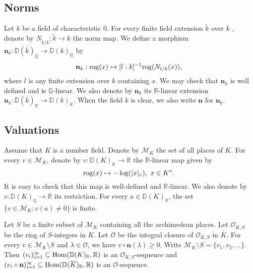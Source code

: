 \documentclass[12pt]{amsart}
\theoremstyle{plain}
\theoremstyle{remark}
\theoremstyle{definition}
\def\Q{\mathbb Q}
\def\R{\mathbb R}
\def\D{\mathbb D}
\def\rog{{\rm rog}}
\begin{document}
\subsection{Norms}Let $k$ be a field of characteristic $0$. For every finite field extension $\widetilde{k}$ over $k$ , denote by $N_{\widetilde{k} / k}: \widetilde{k} \to k$ the norm map. We define a morphism $\mathbf{n}_k: \D(\overline{k}) _{\Q}\to \D(k)_{\Q}$ by\begin{equation*}
	\mathbf{n}_k: \rog (x) \mapsto[l:k]^{-1} \rog (N_{l / k}(x)),
\end{equation*}
where $l$ is any finite extension over $k$ containing $x$. We may check that $\mathbf{n}_k$ is well defined and is $\Q$-linear. 
We also denote by $\mathbf{n}_k$ its $\R$-linear extension $\mathbf{n}_k: \D(\overline{k})_{\R} \to \D(k)_{\R}$. When the field $k$ is clear, we also write $\mathbf{n}$ for $\mathbf{n}_k$. 
\subsection{Valuations}
Assume that $K$ is a number field. Denote by $\mathcal{M}_K$ the set of all places of $K$. For every $v \in \mathcal{M}_K$, denote by $v: \D(K)_{\R} \to\R$ the $\R$-linear map given by$$\rog(x)\mapsto-\log(\lvert x\rvert_{v}),\ x\in K^*.$$It is easy to check that this map is well-defined and $\R$-linear. We also denote by $v: \D(K)_{\Q} \to \R$ its restriction. For every $a \in \D(K)_{\R}$, the set $\{v \in \mathcal{M}_K:v(a) \neq 0\}$ is finite.\par 
Let $S$ be a finite subset of $\mathcal{M}_K$ containing all the archimedean places. Let $\mathcal{O}_{K, S}$ be the ring of $S$-integers in $K$. Let $\mathcal{O}$ be the integral closure of $\mathcal{O}_{K, S}$ in $\overline{K}$. For every $v \in \mathcal{M}_K \setminus S$ and $\lambda \in \mathcal{O}$, we have $v \circ \mathbf{n}(\lambda) \geq 0$. Write $\mathcal{M}_K \setminus S=\{v_{1}, v_{2},\dots\}$. Then $(v_{i})_{i=1}^\infty\subseteq {\rm Hom}(\D(K)_{\R}, \R)$ is an $\mathcal{O}_{K, S}$-sequence and $(v_{i} \circ \mathbf{n})_{i=1}^\infty\subseteq{\rm Hom}(\D(\overline{K})_{\R}, \R)$ is an $\mathcal{O}$-sequence.
\end{document}
